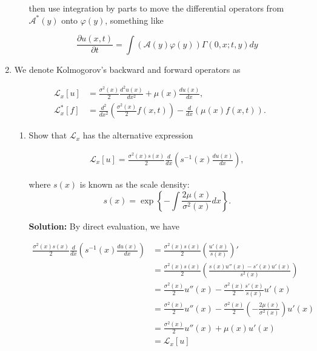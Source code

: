 \documentclass[12pt, a4paper]{article}
\begin{document}
\begin{enumerate}
\begin{enumerate}
        then use integration by parts to move the differential operators from $\mathcal A^*(y)$ onto $\varphi(y)$, something like 

        $$\frac{\partial u(x, t)}{\partial t} = \int (\mathcal A(y)\varphi(y)) \Gamma(0, x; t, y) dy$$
    
    \end{enumerate}
    
    \item We denote Kolmogorov's backward and forward operators as 
    
    \begin{align*}
        \mathscr L_x[u] &= \frac{\sigma^2(x)}{2} \frac{d^2 u(x)}{dx^2} + \mu(x) \frac{du(x)}{dx}, \\
        \mathscr L_x^*[f] &= \frac{d^2}{dx^2}\left( \frac{\sigma^2(x)}{2} f(x,t) \right) - \frac{d}{dx}\left( \mu(x) f(x,t) \right).
    \end{align*}

    \begin{enumerate}
        \item Show that $\mathscr L_x$ has the alternative expression 
        
        \begin{align}
            \mathscr L_x[u] = \frac{\sigma^2(x) s(x)}{2} \frac{d}{dx} \left( s^{-1}(x) \frac{du(x)}{dx} \right),
        \end{align}

        where $s(x)$ is known as the scale density: $$s(x) = \exp \left\{ - \int \frac{2\mu(x)}{\sigma^2(x)}dx \right\}.$$

        \textbf{Solution:} By direct evaluation, we have 

        \begin{align*}
            \frac{\sigma^2(x) s(x)}{2} \frac{d}{dx} \left( s^{-1}(x) \frac{du(x)}{dx} \right) &= \frac{\sigma^2(x) s(x)}{2} \left( \frac{u'(x)}{s(x)} \right)' \\
            &= \frac{\sigma^2(x) s(x)}{2} \left( \frac{s(x) u''(x) - s'(x) u'(x)}{s^2(x)} \right) \\
            &= \frac{\sigma^2(x)}{2} u''(x) - \frac{\sigma^2(x)}{2} \frac{s'(x)}{s(x)} u'(x) \\
            &= \frac{\sigma^2(x)}{2} u''(x) -\frac{\sigma^2(x)}{2} \left(-\frac{2\mu(x)}{\sigma^2(x)} \right) u'(x) \\
            &= \frac{\sigma^2(x)}{2} u''(x) + \mu(x) u'(x) \\
            &= \mathscr L_x[u]
        \end{align*}


\end{enumerate}
\end{enumerate}
\end{document}
